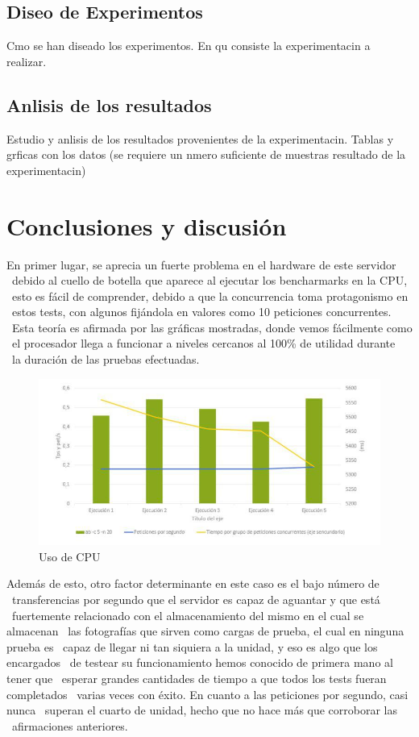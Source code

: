 \documentclass[11pt,twoside,a4paper]{book}
\begin{document}
\section{Diseo de Experimentos}
Cmo se han diseado los experimentos. En qu consiste la experimentacin a realizar.

\section{Anlisis de los resultados}
Estudio y anlisis de los resultados provenientes de la experimentacin. Tablas y grficas con los datos (se requiere un nmero suficiente de muestras resultado de la experimentacin)

\chapter{Conclusiones y discusión}

En primer lugar, se aprecia un fuerte problema en el hardware de este servidor \
debido al cuello de botella que aparece al ejecutar los bencharmarks en la CPU, \
esto es fácil de comprender, debido a que la concurrencia toma protagonismo en \
estos tests, con algunos fijándola en valores como 10 peticiones concurrentes. \
Esta teoría es afirmada por las gráficas mostradas, donde vemos fácilmente como \
el procesador llega a funcionar a niveles cercanos al 100\% de utilidad durante \
la duración de las pruebas efectuadas.

\begin{figure}
   \includegraphics[width=\textwidth]{grafica1.jpg}
   \caption{Uso de CPU}
   \label{cpu}
\end{figure}

Además de esto, otro factor determinante en este caso es el bajo número de \
transferencias por segundo que el servidor es capaz de aguantar y que está \
fuertemente relacionado con el almacenamiento del mismo en el cual se almacenan \
las fotografías que sirven como cargas de prueba, el cual en ninguna prueba es \
capaz de llegar ni tan siquiera a la unidad, y eso es algo que los encargados \
de testear su funcionamiento hemos conocido de primera mano al tener que \
esperar grandes cantidades de tiempo a que todos los tests fueran completados \
varias veces con éxito. En cuanto a las peticiones por segundo, casi nunca \
superan el cuarto de unidad, hecho que no hace más que corroborar las \
afirmaciones anteriores. \newline
\end{document}
